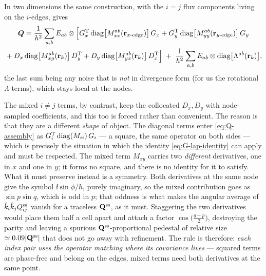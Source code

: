 \documentclass[a5paper]{article}
\begin{document}
In two dimensions the same construction, with the $i=j$ flux components living on the $i$-edges, gives
\begin{multline}
    \label{eq:Q-assembly}
    \bs Q = \frac{1}{h^2}\sum_{a,b} E_{ab}\otimes\Bigl[
      G_x^\T\,\mathrm{diag}\bigl[M^{ab}_{xx}(\r_{x\text{-edge}})\bigr]\,G_x
    + G_y^\T\,\mathrm{diag}\bigl[M^{ab}_{yy}(\r_{y\text{-edge}})\bigr]\,G_y \\
    {}+ D_x\,\mathrm{diag}\bigl[M^{ab}_{xy}(\r_k)\bigr]\,D_y^\T
    + D_y\,\mathrm{diag}\bigl[M^{ab}_{yx}(\r_k)\bigr]\,D_x^\T\Bigr]
    \;+\;\frac{1}{h^2}\sum_{a,b}E_{ab}\otimes\mathrm{diag}\bigl[\Lambda^{ab}(\r_k)\bigr],
\end{multline}
the last sum being any noise that is \emph{not} in divergence form (for us the rotational $\Lambda$ terms), which stays local at the nodes.

The mixed $i\neq j$ terms, by contrast, keep the collocated $D_x, D_y$ with node-sampled coefficients, and this too is forced rather than convenient. The reason is that they are a different \emph{shape} of object. The diagonal terms enter \eqref{eq:Q-assembly} as $G_i^\T\,\mathrm{diag}(M_{ii})\,G_i$ --- a square, the same operator on both sides --- which is precisely the situation in which the identity \eqref{eq:G-lap-identity} can apply and must be respected. The mixed term $M_{xy}$ carries two \emph{different} derivatives, one in $x$ and one in $y$; it forms no square, and there is no identity for it to satisfy. What it must preserve instead is a symmetry. Both derivatives at the same node give the symbol $\ii\sin\phi/h$, purely imaginary, so the mixed contribution goes as $\sin p\sin q$, which is odd in $p$; that oddness is what makes the angular average of $\hat k_i\hat k_jQ^\ss_{ij}$ vanish for a traceless $\Q^\ss$, as it must. Staggering the two derivatives would place them half a cell apart and attach a factor $\cos\bigl(\tfrac{q-p}{2}\bigr)$, destroying the parity and leaving a spurious $\Q^\ss$-proportional pedestal of relative size $\simeq0.09|\Q^\ss|$ that does not go away with refinement. The rule is therefore: \emph{each index pair uses the operator matching where its covariance lives} --- squared terms are phase-free and belong on the edges, mixed terms need both derivatives at the same point.
\end{document}
